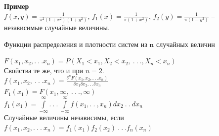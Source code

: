 \documentclass[russian, 12pt, fleqn,x11names]{article}
\begin{document}
\textbf{Пример} \\
$f(x, y) = \frac{1}{\pi^2(1+x^2)(1+y^2)}$, $f_1(x) = \frac{1}{\pi(1+x^2)}$, $f_2(y) = \frac{1}{\pi(1+y^2)}$ -- независимые случайные величины.
\begin{center}
$\textbf{Функции распределения и плотности систем из n случайных величин}$\\
\end{center}
 $F(x_1, x_2, .\ .\ . x_n) = P(X_1 < x_1, X_2 < x_2,\ .\ .\ .,X_n < x_n)$\\
Свойства те же, что и при $n = 2$.\\
$f(x_1, x_2, \ .\ .\ .x_n) = \frac{\delta^nF(x_1, x_2, .\ .\ . x_n)}{\delta x_1 \delta x_2 .\ .\ . \delta x_n}$ \\
$F_1(x_1) = F(x_1, \infty, \ .\ .\ ., \infty)$\\
$f_1(x_1) =  \displaystyle{\int \limits_{-\infty}^{\infty}}.\ .\ .\  \displaystyle{\int \limits_{-\infty}^{\infty}} f(x_1, .\  .\ , x_n) dx_2\ .\ .\ dx_n$\\
Случайные величины независимы, если $f(x_1, x_2, .\ .\ .\ x_n)  = f_1(x_1)  f_2(x_2)\ .\ .\ . f_n(x_n)$\\
\end{document}
